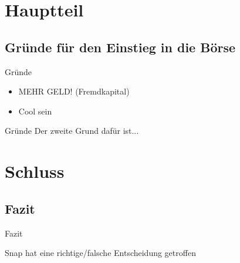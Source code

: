 \documentclass{beamer}
\begin{document}
\section{Hauptteil}
\subsection{Gründe für den Einstieg in die Börse}
\begin{frame} {Gründe}
\begin{itemize}
	\item MEHR GELD! (Fremdkapital)  \pause
	\item Cool sein   \pause
\end{itemize}
\end{frame}

\begin{frame} {Gründe}
Der zweite Grund dafür ist...
\end{frame}


\section{Schluss}
\subsection{Fazit}
\begin{frame}{Fazit}

Snap hat eine richtige/falsche Entscheidung getroffen

\end{frame}
\end{document}
